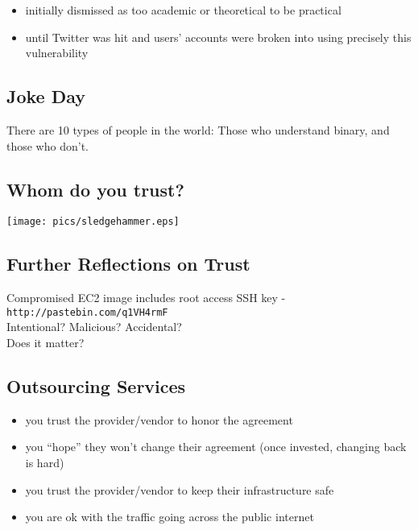 \documentclass[xga]{xdvislides}
\begin{document}
\begin{itemize}
	\item initially dismissed as too academic or theoretical to be practical
	\item until Twitter was hit and users' accounts were broken into using
		precisely this vulnerability
\end{itemize}

\subsection{Joke Day}
\vspace*{\fill}
\begin{center}
\Huge
There are 10 types of people in the world: Those who understand binary,
and those who don't.
\Normalsize
\end{center}
\vspace*{\fill}


\subsection{Whom do you trust?}
\begin{center}
	\texttt{[image: pics/sledgehammer.eps]}
\end{center}

\subsection{Further Reflections on Trust}
Compromised EC2 image includes root access SSH key -
{\tt http://pastebin.com/q1VH4rmF}
\\

Intentional? Malicious? Accidental?
\\

Does it matter?

\subsection{Outsourcing Services}
\begin{itemize}
	\item you trust the provider/vendor to honor the agreement
	\item you ``hope'' they won't change their agreement (once
		invested, changing back is hard)
	\item you trust the provider/vendor to keep their infrastructure
		safe
	\item you are ok with the traffic going across the public internet
\end{itemize}
\end{document}
